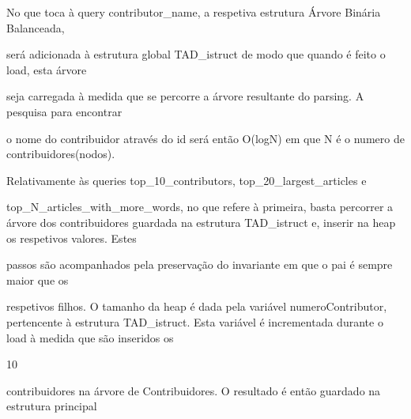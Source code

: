 \documentclass[a4paper,portrait,12pt]{article}
\begin{document}
\begin{flushleft}
No que toca à query contributor\_name, a respetiva estrutura Árvore Binária Balanceada,
\end{flushleft}


\begin{flushleft}
será adicionada à estrutura global TAD\_istruct de modo que quando é feito o load, esta árvore
\end{flushleft}


\begin{flushleft}
seja carregada à medida que se percorre a árvore resultante do parsing. A pesquisa para encontrar
\end{flushleft}


\begin{flushleft}
o nome do contribuidor através do id será então O(logN) em que N é o numero de contribuidores(nodos).
\end{flushleft}


\begin{flushleft}
Relativamente às queries top\_10\_contributors, top\_20\_largest\_articles e
\end{flushleft}


\begin{flushleft}
top\_N\_articles\_with\_more\_words, no que refere à primeira, basta percorrer a árvore dos contribuidores guardada na estrutura TAD\_istruct e, inserir na heap os respetivos valores. Estes
\end{flushleft}


\begin{flushleft}
passos são acompanhados pela preservação do invariante em que o pai é sempre maior que os
\end{flushleft}


\begin{flushleft}
respetivos filhos. O tamanho da heap é dada pela variável numeroContributor, pertencente à estrutura TAD\_istruct. Esta variável é incrementada durante o load à medida que são inseridos os
\end{flushleft}





10





\begin{flushleft}
\newpage
contribuidores na árvore de Contribuidores. O resultado é então guardado na estrutura principal
\end{flushleft}
\end{document}

